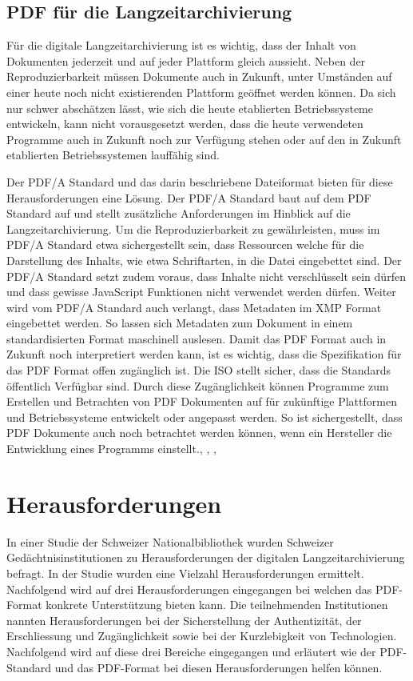 \documentclass[a4paper,oneside, 12pt]{report}
\begin{document}
\section{PDF für die Langzeitarchivierung}
Für die digitale Langzeitarchivierung ist es wichtig, dass der Inhalt von Dokumenten jederzeit und auf jeder Plattform gleich aussieht. Neben der Reproduzierbarkeit müssen Dokumente auch in Zukunft, unter Umständen auf einer heute noch nicht existierenden Plattform geöffnet werden können. Da sich nur schwer abschätzen lässt, wie sich die heute etablierten Betriebssysteme entwickeln, kann nicht vorausgesetzt werden, dass die heute verwendeten Programme auch in Zukunft noch zur Verfügung stehen oder auf den in Zukunft etablierten Betriebssystemen lauffähig sind.

Der PDF/A Standard und das darin beschriebene Dateiformat bieten für diese Herausforderungen eine Lösung. Der PDF/A Standard baut auf dem PDF Standard auf und stellt zusätzliche Anforderungen im Hinblick auf die Langzeitarchivierung. Um die Reproduzierbarkeit zu gewährleisten, muss im PDF/A Standard etwa sichergestellt sein, dass Ressourcen welche für die Darstellung des Inhalts, wie etwa Schriftarten, in die Datei eingebettet sind. Der PDF/A Standard setzt zudem voraus, dass Inhalte nicht verschlüsselt sein dürfen und dass gewisse JavaScript Funktionen nicht verwendet werden dürfen. Weiter wird vom PDF/A Standard auch verlangt, dass Metadaten im \ac{XMP} Format eingebettet werden. So lassen sich Metadaten zum Dokument in einem standardisierten Format maschinell auslesen. Damit das PDF Format auch in Zukunft noch interpretiert werden kann, ist es wichtig, dass die Spezifikation für das PDF Format offen zugänglich ist. Die \ac{ISO} stellt sicher, dass die Standards öffentlich Verfügbar sind. Durch diese Zugänglichkeit können Programme zum Erstellen und Betrachten von PDF Dokumenten auf für zukünftige Plattformen und Betriebssysteme entwickelt oder angepasst werden. So ist sichergestellt, dass PDF Dokumente auch noch betrachtet werden können, wenn ein Hersteller die Entwicklung eines Programms einstellt.\cite{pdfanutshell}, \cite{Arms2005DigitalFF}, \cite{ISO32000}, \cite{ISO19005}

 
\chapter{Herausforderungen}\label{sec:herausforderungen}
In einer Studie der Schweizer Nationalbibliothek wurden Schweizer Gedächtnisinstitutionen zu Herausforderungen der digitalen Langzeitarchivierung befragt. In der Studie wurden eine Vielzahl Herausforderungen ermittelt. Nachfolgend wird auf drei Herausforderungen eingegangen bei welchen das PDF-Format konkrete Unterstützung bieten kann. Die teilnehmenden Institutionen nannten Herausforderungen bei der Sicherstellung der Authentizität, der Erschliessung und Zugänglichkeit sowie bei der Kurzlebigkeit von Technologien. Nachfolgend wird auf diese drei Bereiche eingegangen und erläutert wie der PDF-Standard und das PDF-Format bei diesen Herausforderungen helfen können. \cite{lzaschweiz}
\end{document}
